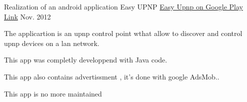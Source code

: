 \begin{cventries}

\cventry
{Realization of an android application } %
{Easy UPNP} %
{ \href{https://play.google.com/store/apps/details?id=com.EasySoft.easyup}{Easy Upnp on Google Play Link} } %
{Nov. 2012} %
{ %
\begin{cvitems}
\item {The applicartion is an upnp control point wthat allow to discover and control upnp devices on a lan network.}
\item {This app was completly developpend with Java code.}
\item {This app also contains advertissment , it's done with google AdsMob..}
\item {This app is no more maintained}
\end{cvitems}
}



\end{cventries}
